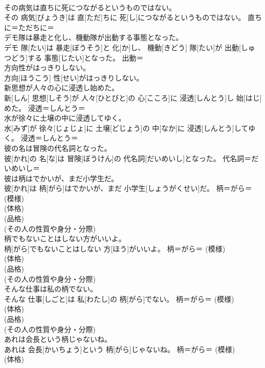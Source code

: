 \documentclass[8pt]{extreport}
\begin{document}
\begin{CJK}{UTF8}{min}
\\	その病気は直ちに死につながるというものではない。	
\\	その 病気[びょうき]は 直[ただ]ちに 死[し]につながるというものではない。	直ちに＝ただちに＝ 
\\	デモ隊は暴走と化し、機動隊が出動する事態となった。	
\\	デモ 隊[たい]は 暴走[ぼうそう]と 化[か]し、 機動[きどう] 隊[たい]が 出動[しゅつどう]する 事態[じたい]となった。	出動＝ 
\\	方向性がはっきりしない。	
\\	方向[ほうこう] 性[せい]がはっきりしない。	
\\	新思想が人々の心に浸透し始めた。	
\\	新[しん] 思想[しそう]が 人々[ひとびと]の 心[こころ]に 浸透[しんとう]し 始[はじ]めた。	浸透＝しんとう＝ 
\\	水が徐々に土壌の中に浸透してゆく。	
\\	水[みず]が 徐々[じょじょ]に 土壌[どじょう]の 中[なか]に 浸透[しんとう]してゆく。	浸透＝しんとう＝ 
\\	彼の名は冒険の代名詞となった。	
\\	彼[かれ]の 名[な]は 冒険[ぼうけん]の 代名詞[だいめいし]となった。	代名詞＝だいめいし＝ 
\\	彼は柄はでかいが、まだ小学生だ。	
\\	彼[かれ]は 柄[がら]はでかいが、まだ 小学生[しょうがくせい]だ。	柄＝がら＝ (模様) 
\\	(体格) 
\\	(品格) 
\\	(その人の性質や身分・分際)
\\	柄でもないことはしない方がいいよ。	
\\	柄[がら]でもないことはしない 方[ほう]がいいよ。	柄＝がら＝ (模様) 
\\	(体格) 
\\	(品格) 
\\	(その人の性質や身分・分際)
\\	そんな仕事は私の柄でない。	
\\	そんな 仕事[しごと]は 私[わたし]の 柄[がら]でない。	柄＝がら＝ (模様) 
\\	(体格) 
\\	(品格) 
\\	(その人の性質や身分・分際)
\\	あれは会長という柄じゃないね。	
\\	あれは 会長[かいちょう]という 柄[がら]じゃないね。	柄＝がら＝ (模様) 
\\	(体格) 

\end{CJK}
\end{document}
